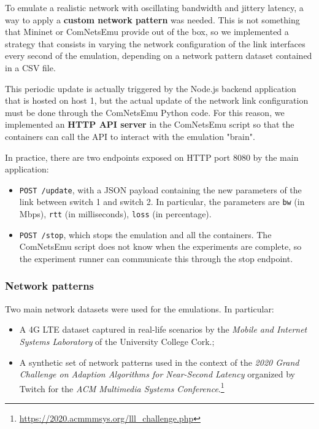 To emulate a realistic network with oscillating bandwidth and jittery latency, a way to apply a \textbf{custom network pattern} was needed. This is not something that Mininet or ComNetsEmu provide out of the box, so we implemented a strategy that consists in varying the network configuration of the link interfaces every second of the emulation, depending on a network pattern dataset contained in a CSV file.

This periodic update is actually triggered by the Node.js backend application that is hosted on host 1, but the actual update of the network link configuration must be done through the ComNetsEmu Python code. For this reason, we implemented an \textbf{HTTP API server} in the ComNetsEmu script so that the containers can call the API to interact with the emulation "brain".

In practice, there are two endpoints exposed on HTTP port 8080 by the main application:

\begin{itemize}
    \item \texttt{POST /update}, with a JSON payload containing the new parameters of the link between switch 1 and switch 2. In particular, the parameters are \texttt{bw} (in Mbps), \texttt{rtt} (in milliseconds), \texttt{loss} (in percentage).
    \item \texttt{POST /stop}, which stops the emulation and all the containers. The ComNetsEmu script does not know when the experiments are complete, so the experiment runner can communicate this through the stop endpoint.
\end{itemize}

\subsubsection{Network patterns}
\label{sec:eval/testbed/network/patterns}

Two main network datasets were used for the emulations. In particular:

\begin{itemize}
    \item A 4G LTE dataset captured in real-life scenarios by the \textit{Mobile and Internet Systems Laboratory} of the University College Cork.\cite{dataset1};
    \item A synthetic set of network patterns used in the context of the \textit{2020 Grand Challenge on Adaption Algorithms for Near-Second Latency} organized by Twitch for the \textit{ACM Multimedia Systems Conference}.\footnote{\url{https://2020.acmmmsys.org/lll_challenge.php}}
\end{itemize}

